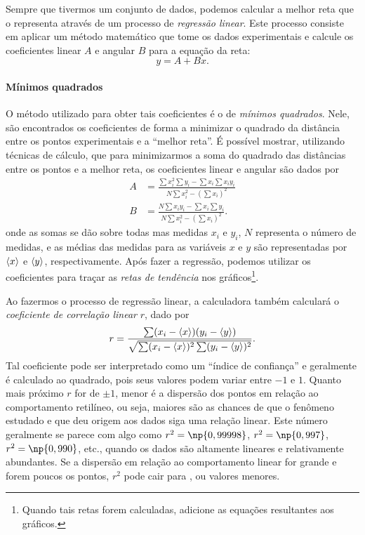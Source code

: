 Sempre que tivermos um conjunto de dados, podemos calcular a melhor reta que o representa através de um processo de \emph{regressão linear}. Este processo consiste em aplicar um método matemático que tome os dados experimentais e calcule os coeficientes linear $A$ e angular $B$ para a equação da reta:
\begin{equation}
	y = A + Bx.
\end{equation}

\paragraph{Mínimos quadrados}

O método utilizado para obter tais coeficientes é o de \emph{mínimos quadrados}. Nele, são encontrados os coeficientes de forma a minimizar o quadrado da distância entre os pontos experimentais e a ``melhor reta''. É possível mostrar\cite{Taylor}, utilizando técnicas de cálculo, que para minimizarmos a soma do quadrado das distâncias entre os pontos e a melhor reta, os coeficientes linear e angular são dados por
\begin{align}
	A &= \frac{\sum x_i^2 \sum y_i - \sum x_i \sum x_iy_i}{N \sum x_i^2 - (\sum x_i)^2} \\
	B &= \frac{N\sum x_iy_i - \sum x_i \sum y_i}{N \sum x_i^2 - (\sum x_i)^2}.
\end{align}
%
onde as somas se dão sobre todas mas medidas $x_i$ e $y_i$, $N$ representa o número de medidas, e as médias das medidas para as variáveis $x$ e $y$ são representadas por $\left\langle{x}\right\rangle$ e $\left\langle{y}\right\rangle$, respectivamente. Após fazer a regressão, podemos utilizar os coeficientes para traçar as \emph{retas de tendência} nos gráficos\footnote{Quando tais retas forem calculadas, adicione as equações resultantes aos gráficos.}.

Ao fazermos o processo de regressão linear, a calculadora também calculará o \emph{coeficiente de correlação linear} $r$, dado por
\begin{equation}
	r = \frac{\sum (x_i - \left\langle{x}\right\rangle)(y_i-\left\langle{y}\right\rangle)}{\sqrt{\sum(x_i - \left\langle{x}\right\rangle)^2\sum (y_i - \left\langle{y}\right\rangle)^2}}.
\end{equation}
%
Tal coeficiente pode ser interpretado como um ``índice de confiança'' e geralmente é calculado ao quadrado, pois seus valores podem variar entre $-1$ e $1$. Quanto mais próximo $r$ for de $\pm 1$, menor é a dispersão dos pontos em relação ao comportamento retilíneo, ou seja, maiores são as chances de que o fenômeno estudado e que deu origem aos dados siga uma relação linear. Este número geralmente se parece com algo como $r^2=\np{0,99998}$, $r^2=\np{0,997}$, $r^2= \np{0,990}$, etc., quando os dados são altamente lineares e relativamente abundantes. Se a dispersão em relação ao comportamento linear for grande e forem poucos os pontos, $r^2$ pode cair para , ou valores menores.

